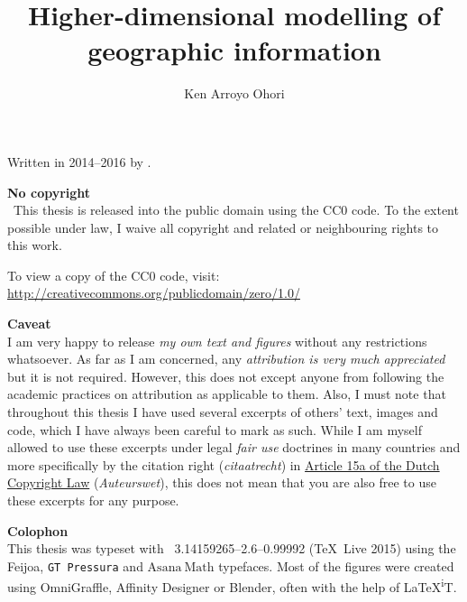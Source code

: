 
% 

\author{Ken Arroyo Ohori}
\title{Higher-dimensional modelling of geographic information}
\date{}
\maketitle

\clearpage
\thispagestyle{empty}
\null%
\label{thesis:colophon}
\vfill
{}
Written in 2014--2016 by
{\makeatletter
\href{http://ken.mx}{\@author}%
\makeatother}.

\textbf{No copyright}\\
\cczero\ This thesis is released into the public domain using the CC0 code.
To the extent possible under law, I waive all copyright and related or neighbouring rights to this work.

To view a copy of the CC0 code, visit: \\
\url{http://creativecommons.org/publicdomain/zero/1.0/}

\textbf{Caveat} \\
I am very happy to release \emph{my own text and figures} without any restrictions whatsoever.
As far as I am concerned, any \emph{attribution is very much appreciated} but it is not required.
However, this does not except anyone from following the academic practices on attribution as applicable to them.
Also, I must note that throughout this thesis I have used several excerpts of others' text, images and code, which I have always been careful to mark as such.
While I am myself allowed to use these excerpts under legal \emph{fair use} doctrines in many countries and more specifically by the citation right (\emph{citaatrecht}) in \href{http://wetten.overheid.nl/jci1.3:c:BWBR0001886&hoofdstuk=I&paragraaf=6&artikel=15a&z=2015-07-01&g=2015-07-01}{Article 15a of the Dutch Copyright Law} (\emph{Auteurswet}), this does not mean that you are also free to use these excerpts for any purpose.

\textbf{Colophon} \\
This thesis was typeset with \XeTeX\ 3.14159265--2.6--0.99992 (\TeX\ Live 2015) using the \mbox{{\fanciestfont{}Feijoa}}, \texttt{GT Pressura} and $\mathrm{Asana\ Math}$ typefaces.
Most of the figures were created using OmniGraffle, Affinity Designer or Blender, often with the help of \LaTeX{}\textsuperscript{i}T.

